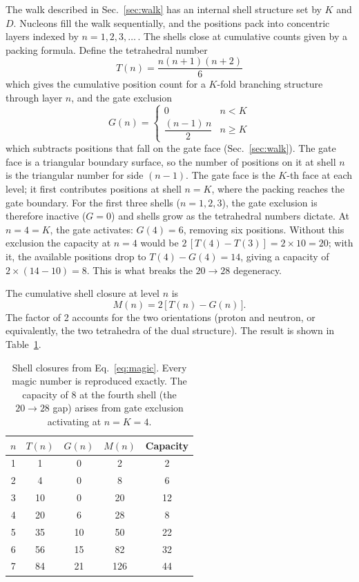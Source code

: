 \documentclass[fleqn,usenatbib]{mnras}
\begin{document}
The walk described in Sec.~\ref{sec:walk} has an internal shell structure set by $K$ and $D$. Nucleons fill the walk sequentially, and the positions pack into concentric layers indexed by $n = 1, 2, 3, \ldots$\,. The shells close at cumulative counts given by a packing formula. Define the tetrahedral number
\begin{equation}
T(n) = \frac{n(n+1)(n+2)}{6}
\end{equation}
which gives the cumulative position count for a $K$-fold branching structure through layer $n$, and the gate exclusion
\begin{equation}
G(n) = \begin{cases} 0 & n < K \\ \dfrac{(n-1)\,n}{2} & n \geq K \end{cases}
\end{equation}
which subtracts positions that fall on the gate face (Sec.~\ref{sec:walk}). The gate face is a triangular boundary surface, so the number of positions on it at shell $n$ is the triangular number for side $(n-1)$. The gate face is the $K$-th face at each level; it first contributes positions at shell $n = K$, where the packing reaches the gate boundary. For the first three shells ($n = 1, 2, 3$), the gate exclusion is therefore inactive ($G = 0$) and shells grow as the tetrahedral numbers dictate. At $n = 4 = K$, the gate activates: $G(4) = 6$, removing six positions. Without this exclusion the capacity at $n = 4$ would be $2\,[T(4) - T(3)] = 2 \times 10 = 20$; with it, the available positions drop to $T(4) - G(4) = 14$, giving a capacity of $2 \times (14 - 10) = 8$. This is what breaks the $20\!\to\!28$ degeneracy.

The cumulative shell closure at level $n$ is
\begin{equation}
M(n) = 2\,\big[\,T(n) - G(n)\,\big].
\label{eq:magic}
\end{equation}
The factor of 2 accounts for the two orientations (proton and neutron, or equivalently, the two tetrahedra of the dual structure). The result is shown in Table~\ref{tab:magic}.

\begin{table}
\centering
\caption{Shell closures from Eq.~\ref{eq:magic}. Every magic number is reproduced exactly. The capacity of 8 at the fourth shell (the $20\!\to\!28$ gap) arises from gate exclusion activating at $n = K = 4$.}
\label{tab:magic}
\begin{tabular*}{\columnwidth}{@{\extracolsep{\fill}}ccccc@{}}
\hline
$n$ & $T(n)$ & $G(n)$ & $M(n)$ & Capacity \\
\hline
1 &  1 & 0 &   2 &  2 \\
2 &  4 & 0 &   8 &  6 \\
3 & 10 & 0 &  20 & 12 \\
4 & 20 & 6 &  28 &  8 \\
5 & 35 & 10 &  50 & 22 \\
6 & 56 & 15 &  82 & 32 \\
7 & 84 & 21 & 126 & 44 \\
\hline
\end{tabular*}
\end{table}
\end{document}
